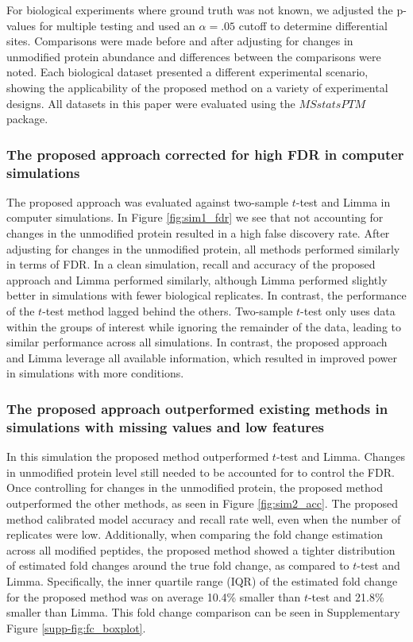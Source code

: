 \documentclass[mcp]{article}
\numberwithin{table}{section}
\begin{document}
For biological experiments where ground truth was not known, we adjusted the p-values for multiple testing and used an $\alpha=.05$ cutoff to determine differential sites. Comparisons were made before and after adjusting for changes in unmodified protein abundance and differences between the comparisons were noted. Each biological dataset presented a different experimental scenario, showing the applicability of the proposed method on a variety of experimental designs. All datasets in this paper were evaluated using the $MSstatsPTM$ package.

\subsubsection*{The proposed approach corrected for high FDR in computer simulations}

The proposed approach was evaluated against two-sample $t$-test and Limma in computer simulations. 
In Figure \ref{fig:sim1_fdr} we see that not accounting for changes in the unmodified protein resulted in a high false discovery rate. After adjusting for changes in the unmodified protein, all methods performed similarly in terms of FDR. In a clean simulation, recall and accuracy of the proposed approach and Limma performed similarly, although Limma performed slightly better in simulations with fewer biological replicates. In contrast, the performance of the $t$-test method lagged behind the others. Two-sample $t$-test only uses data within the groups of interest while ignoring the remainder of the data, leading to similar performance across all simulations. In contrast, the proposed approach and Limma leverage all available information, which resulted in improved power in simulations with more conditions.

\subsubsection*{The proposed approach outperformed existing methods in simulations with missing values and low features}

In this simulation the proposed method outperformed $t$-test and Limma. Changes in unmodified protein level still needed to be accounted for to control the FDR. Once controlling for changes in the unmodified protein, the proposed method outperformed the other methods, as seen in Figure \ref{fig:sim2_acc}. The proposed method calibrated model accuracy and recall rate well, even when the number of replicates were low. Additionally, when comparing the fold change estimation across all modified peptides, the proposed method showed a tighter distribution of estimated fold changes around the true fold change, as compared to $t$-test and Limma. Specifically, the inner quartile range (IQR) of the estimated fold change for the proposed method was on average 10.4\% smaller than $t$-test and 21.8\% smaller than Limma. This fold change comparison can be seen in Supplementary Figure \ref{supp-fig:fc_boxplot}.
\end{document}
